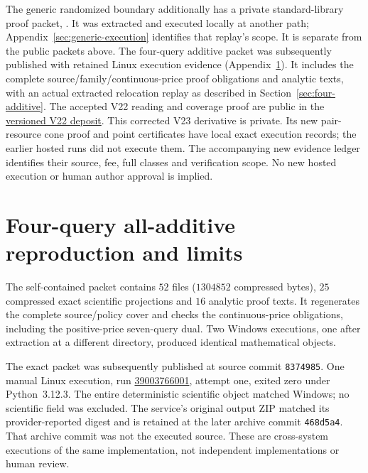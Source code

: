 \documentclass[pdflatex,sn-mathphys-num]{sn-jnl}
\theoremstyle{thmstyleone}
\theoremstyle{thmstylethree}
\theoremstyle{thmstyletwo}
\begin{document}
The generic randomized boundary additionally has a private standard-library proof packet, . It was extracted and executed locally at another path; Appendix~\ref{sec:generic-execution} identifies that replay's scope. It is separate from the public packets above. The four-query additive packet  was subsequently published with retained Linux execution evidence (Appendix~\ref{app:four-additive-replay}). It includes the complete source/family/continuous-price proof obligations and analytic texts, with an actual extracted relocation replay as described in Section~\ref{sec:four-additive}. The accepted V22 reading and coverage proof are public in the
\href{https://github.com/SHiJiE1115/newproj/tree/5df6889dca8928d6a676da980e6ceb9b2ba515d3/manuscript/journal_v22_reading}{versioned V22 deposit}.
This corrected V23 derivative is private. Its new pair-resource cone proof
and point certificates have local exact execution records; the earlier
hosted runs did not execute them. The accompanying new evidence ledger
identifies their source, fee, full classes and verification scope.
No new hosted execution or human author approval is implied.

\section{Four-query all-additive reproduction and limits}
\label{app:four-additive-replay}
The self-contained packet  contains $52$
files ($1304852$ compressed bytes), $25$ compressed exact scientific
projections and $16$ analytic proof texts. It regenerates the complete
source/policy cover and checks the continuous-price obligations, including
the positive-price seven-query dual. Two Windows executions, one after
extraction at a different directory, produced identical mathematical objects.

The exact packet was subsequently published at source commit
\texttt{8374985}. One manual Linux execution, run
\href{https://github.com/SHiJiE1115/newproj/actions/runs/39003766001}{39003766001},
attempt one, exited zero under Python~3.12.3. The entire deterministic
scientific object matched Windows; no scientific field was excluded.
The service's original output ZIP matched its provider-reported digest
and is retained at the later archive commit \texttt{468d5a4}. That archive
commit was not the executed source. These are cross-system executions
of the same implementation, not independent implementations or human review.
\end{document}
